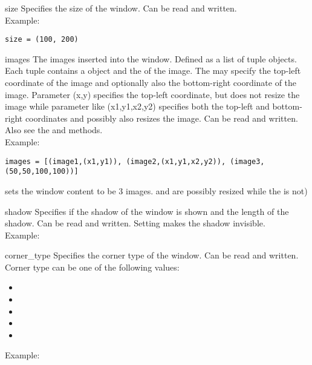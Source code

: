 \begin{memberdesc}[TopWindow]{size}
Specifies the size of the window. Can be read and written.
\\Example:
\begin{verbatim} 
size = (100, 200)
\end{verbatim}
\end{memberdesc}

\begin{memberdesc}[TopWindow]{images}
The images inserted into the window. Defined as a list of tuple objects. Each 
tuple contains a  object and the  of the 
image. The  may specify the top-left coordinate of the image and 
optionally also the bottom-right coordinate of the image. Parameter (x,y) 
specifies the top-left coordinate, but does not resize the image while 
parameter like (x1,y1,x2,y2) specifies both the top-left and bottom-right 
coordinates and possibly also resizes the image. Can be read and written.
Also see the  and  methods.
\\Example: 
\begin{verbatim}
images = [(image1,(x1,y1)), (image2,(x1,y1,x2,y2)), (image3,(50,50,100,100))]
\end{verbatim}
sets the window content to be 3 images.  and  are possibly resized 
while the  is not)
\end{memberdesc}

\begin{memberdesc}[TopWindow]{shadow}
Specifies if the shadow of the window is shown and the length of the shadow. 
Can be read and written. Setting  makes the shadow invisible.
\\Example: 
\end{memberdesc}

\begin{memberdesc}[TopWindow]{corner_type}
Specifies the corner type of the window. Can be read and written. Corner type 
can be one of the following values: 
\begin{itemize}
\item {}
\item {}
\item {}
\item {}
\item {}
\end{itemize}

Example: 
\end{memberdesc}

